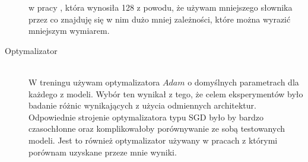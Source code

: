 \begin{description}
w pracy \cite{hellendoorn}, która wynosiła 128 z powodu, że używam mniejszego słownika przez co znajduję się w nim dużo mniej zależności, które można wyrazić mniejszym wymiarem.\\
\item[Optymalizator]
\hfill \\
W treningu używam optymalizatora \begin{math}Adam\end{math} o domyślnych parametrach dla każdego z modeli.
Wybór ten wynikał z tego, że celem eksperymentów było badanie różnic wynikających z użycia odmiennych architektur. 
Odpowiednie strojenie optymalizatora typu SGD było by bardzo czasochłonne oraz komplikowałoby porównywanie ze sobą testowanych modeli.
 Jest to również optymalizator używany w pracach 
z którymi porównam uzyskane przeze mnie wyniki.  
\end{description}

